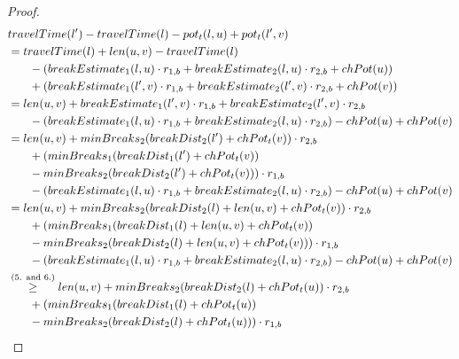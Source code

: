 \begin{proof}
	\begin{align}
		\begin{split}\label{eq:label_n_feasibility_proof_1}
			&\concretett(l') - \concretett(l) - \concretepotential_t(l,u) + \concretepotential_t(l',v)\\
			&= \concretett(l) + \len(u,v) - \concretett(l)\\
			& \phantom{{}=1} - (\breakEstimate_1(l,u) \cdot \restr_{1,b} + \breakEstimate_2(l,u) \cdot \restr_{2,b} + \chpotential(u))\\
			& \phantom{{}=1} + (\breakEstimate_1(l',v) \cdot \restr_{1,b} + \breakEstimate_2(l',v) \cdot \restr_{2,b} + \chpotential(v))\\
			&= \len(u,v) + \breakEstimate_1(l',v) \cdot \restr_{1,b} + \breakEstimate_2(l',v) \cdot \restr_{2,b} \\
			& \phantom{{}=1} - (\breakEstimate_1(l,u) \cdot \restr_{1,b} + \breakEstimate_2(l,u) \cdot \restr_{2,b}) - \chpotential(u) + \chpotential(v)\\
			&= \len(u,v) + \minBreaks_2(\breakDist_2(l') + \chpotential_t(v)) \cdot \restr_{2,b}\\
			& \phantom{{}=1} + (\minBreaks_1(\breakDist_1(l') + \chpotential_t(v))\\
			& \phantom{{}=1} - \minBreaks_{2}(\breakDist_{2}(l') + \chpotential_t(v))) \cdot \restr_{1,b} \\
			& \phantom{{}=1} - (\breakEstimate_1(l,u) \cdot \restr_{1,b} + \breakEstimate_2(l,u) \cdot \restr_{2,b}) - \chpotential(u) + \chpotential(v)\\
			&= \len(u,v) + \minBreaks_2(\breakDist_2(l) + \len(u,v) + \chpotential_t(v)) \cdot \restr_{2,b}\\
			& \phantom{{}=1} + (\minBreaks_1(\breakDist_1(l) + \len(u,v) + \chpotential_t(v))\\
			& \phantom{{}=1} - \minBreaks_{2}(\breakDist_{2}(l) + \len(u,v) + \chpotential_t(v))) \cdot \restr_{1,b} \\
			& \phantom{{}=1} - (\breakEstimate_1(l,u) \cdot \restr_{1,b} + \breakEstimate_2(l,u) \cdot \restr_{2,b}) - \chpotential(u) + \chpotential(v)\\
			&\stackrel{\text{(5. and 6.)}}{\ge} \len(u,v) + \minBreaks_2(\breakDist_2(l) + \chpotential_t(u)) \cdot \restr_{2,b}\\
			& \phantom{{}=1} + (\minBreaks_1(\breakDist_1(l) + \chpotential_t(u))\\
			& \phantom{{}=1} - \minBreaks_{2}(\breakDist_{2}(l) + \chpotential_t(u))) \cdot \restr_{1,b} \\

\end{split}
\end{align}
\end{proof}
